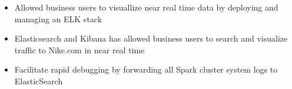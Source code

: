 \documentclass[overlapped]{res}
\begin{document}
\begin{resume}
\begin{itemize}[leftmargin=0in]
\begin{itemize}[leftmargin=0in]
\begin{samepage}
\begin{itemize}
                        \item[\textbullet] Allowed business users to visuallize near real time data by deploying and managing an ELK stack
                        \item[\textbullet] Elasticsearch and Kibana has allowed business users to search and visualize traffic to Nike.com in near real time
                        \item[\textbullet] Facilitate rapid debugging by forwarding all Spark cluster system logs to ElasticSearch
                    \end{itemize}
                \end{samepage}
        \end{itemize}
\end{itemize}
\vspace{0.25in}


\end{resume}
\end{document}
